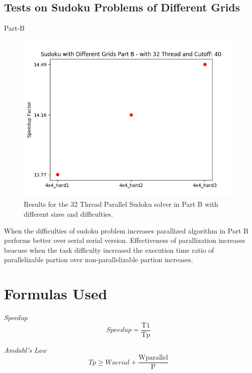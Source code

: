 \documentclass{article}
\newcommand\tab[1][0.5cm]{\hspace*{#1}}
\begin{document}
\subsection{Tests on Sudoku Problems of Different Grids}
\begin{description}
\item[Part-B]
\end{description} 
\begin{figure}[!htb]
    \centering
    \includegraphics[width=1\linewidth]{./img/grids_part_2_B.png}
    \caption{Results for the 32 Thread Parallel Sudoku solver in Part B with different sizes and difficulties.}
\end{figure}
\tab When the difficulties of sudoku problem increases parallized algorithm in Part B performs better 
over serial serial version. Effectiveness of parallization increases beacuse when the task difficulty
increased the execution time ratio of parallelizable partion over non-parallelizable partion increases. 


\section{Formulas Used}

\begin{enumerate}
\begin{item}
    \emph{Speedup} 
    \begin{equation*}
    Speedup  = \frac{\mathrm{T1}}{\mathrm{Tp}}
    \end{equation*}
\end{item}
\begin{item}
    \emph{Amdahl's Law} 
    \begin{equation*}
    Tp \geq Wserial + \frac{\mathrm{Wparallel}}{\mathrm{P}}
    \end{equation*}
\end{item}
\end{enumerate}
\end{document}
